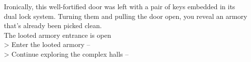Ironically, this well-fortified door was left with a pair of keys embedded in its dual lock system. Turning them and pulling the door open, you reveal an armory that's already been picked clean.\\
 The looted armory entrance is open\\

> Enter the looted armory -- \\ 
> Continue exploring the complex halls -- 